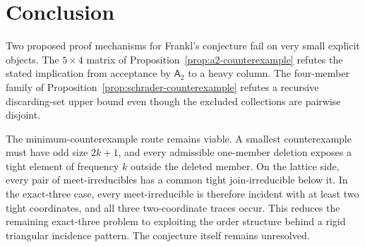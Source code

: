\documentclass[11pt]{amsart}
\theoremstyle{definition}
\theoremstyle{remark}
\newcommand{\Aalg}{\mathsf A_2}
\begin{document}
\section{Conclusion}

Two proposed proof mechanisms for Frankl's conjecture fail on very small explicit objects. The $5\times4$ matrix of Proposition~\ref{prop:a2-counterexample} refutes the stated implication from acceptance by $\Aalg$ to a heavy column. The four-member family of Proposition~\ref{prop:schrader-counterexample} refutes a recursive discarding-set upper bound even though the excluded collections are pairwise disjoint.

The minimum-counterexample route remains viable. A smallest counterexample must have odd size $2k+1$, and every admissible one-member deletion exposes a tight element of frequency $k$ outside the deleted member. On the lattice side, every pair of meet-irreducibles has a common tight join-irreducible below it. In the exact-three case, every meet-irreducible is therefore incident with at least two tight coordinates, and all three two-coordinate traces occur. This reduces the remaining exact-three problem to exploiting the order structure behind a rigid triangular incidence pattern. The conjecture itself remains unresolved.



\end{document}
